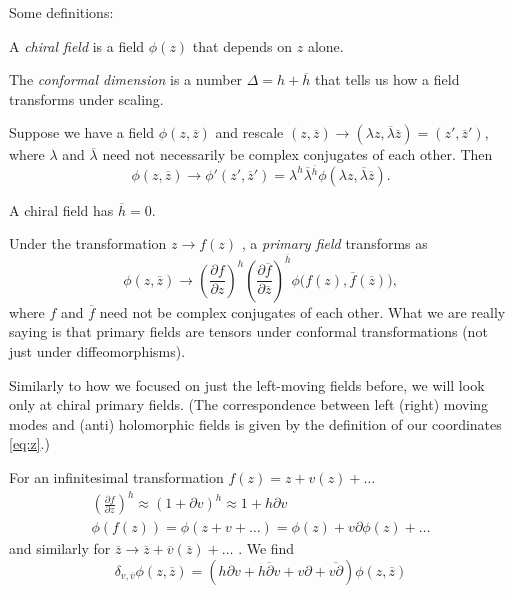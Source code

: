 Some definitions:
\begin{definition}
  A \emph{chiral field} is a field $\phi(z)$ that depends on $z$ alone.
\end{definition}
\begin{definition}
  The \emph{conformal dimension} is a number $\Delta = h + \overline{h}{}$ that tells us how a field transforms under scaling.

  Suppose we have a field $\phi(z, \overline{z}{})$ and rescale $(z, \overline{z}{}) \to (\lambda z, \overline{\lambda}{} \overline{z}{}) = (z', \overline{z}{}')$,
  where $\lambda$ and $\overline{\lambda}{}$ need not necessarily be complex conjugates of each other.
  Then
  \begin{equation}
    \phi(z, \overline{z}{}) \to \phi'(z', \overline{z}{}') = \lambda^{h} \overline{\lambda}{}^{\overline{h}{}} \phi(\lambda z, \overline{\lambda}{} \overline{z}{}).
  \end{equation}
\end{definition}
\begin{remark}
  A chiral field has $\overline{h}{} = 0$.
\end{remark}

\begin{definition}
  Under the transformation $z \to f(z)$ , a \emph{primary field} transforms as
  \begin{equation}
    \phi(z, \overline{z}{}) \to \left( \frac{\partial f}{\partial z} \right)^h \left( \frac{\partial \overline{f}{}}{\partial \overline{z}{}} \right)^{\overline{h}{}} \phi \bigl(f(z), \overline{f}{}(\overline{z}{})\bigr),
  \end{equation}
  where $f$ and $\overline{f}{}$ need not be complex conjugates of each other.
  What we are really saying is that primary fields are tensors under conformal transformations (not just under diffeomorphisms).
\end{definition}

Similarly to how we focused on just the left-moving fields before, we will look only at chiral primary fields. (The correspondence between left (right) moving modes and (anti) holomorphic fields is given by the definition of our coordinates \eqref{eq:z}.)

For an infinitesimal transformation $f(z) = z + v(z) + \dots$
\begin{gather}
  \left( \frac{\partial f}{\partial z} \right)^h \approx (1 + \partial v)^h \approx 1 + h \partial v \\
  \phi(f(z)) = \phi(z + v + \dots) = \phi(z) + v \partial \phi(z) + \dots
\end{gather}
and similarly for $\overline{z}{} \to \overline{z}{} + \overline{v}{}(\overline{z}{}) + \dots$ .
We find
\begin{equation}
  \boxed{ \delta_{v, \overline{v}{}} \phi(z, \overline{z}{}) = \left( h \partial v + \overline{h \partial v}{} + v \partial + \overline{v \partial}{} \right) \phi(z, \overline{z}{}) }
\end{equation}

